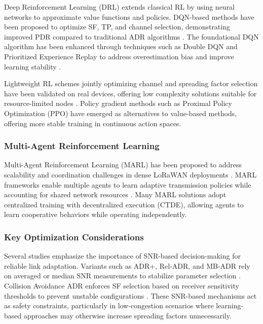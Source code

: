 \documentclass[12pt,a4paper]{article}
\begin{document}
Deep Reinforcement Learning (DRL) extends classical RL by using neural networks to approximate value functions and policies. DQN-based methods have been proposed to optimize SF, TP, and channel selection, demonstrating improved PDR compared to traditional ADR algorithms \cite{Zhong2022drl, Sandoval2020rl, Milarokostas2024qlearning}. The foundational DQN algorithm \cite{mnih2015human} has been enhanced through techniques such as Double DQN \cite{van2016deep} and Prioritized Experience Replay \cite{schaul2015prioritized} to address overestimation bias and improve learning stability \cite{Zholamanov2024}.

Lightweight RL schemes jointly optimizing channel and spreading factor selection have been validated on real devices, offering low complexity solutions suitable for resource-limited nodes \cite{Slabicki2020adaptive}. Policy gradient methods such as Proximal Policy Optimization (PPO) \cite{schulman2017proximal} have emerged as alternatives to value-based methods, offering more stable training in continuous action spaces.

\subsubsection{Multi-Agent Reinforcement Learning}

Multi-Agent Reinforcement Learning (MARL) has been proposed to address scalability and coordination challenges in dense LoRaWAN deployments \cite{Benkhelifa2020distributed}. MARL frameworks enable multiple agents to learn adaptive transmission policies while accounting for shared network resources \cite{Benkhelifa2020distributed}. Many MARL solutions adopt centralized training with decentralized execution (CTDE), allowing agents to learn cooperative behaviors while operating independently.

\subsubsection{Key Optimization Considerations}

Several studies emphasize the importance of SNR-based decision-making for reliable link adaptation. Variants such as ADR+, Rel-ADR, and MB-ADR rely on averaged or median SNR measurements to stabilize parameter selection \cite{Finnegan2020adr}. Collision Avoidance ADR enforces SF selection based on receiver sensitivity thresholds to prevent unstable configurations \cite{Kufakunesu2024}. These SNR-based mechanisms act as safety constraints, particularly in low-congestion scenarios where learning-based approaches may otherwise increase spreading factors unnecessarily.
\end{document}
